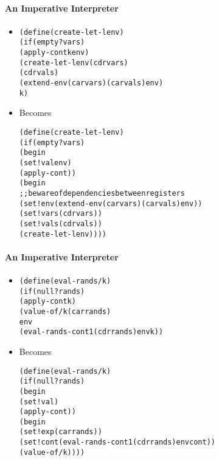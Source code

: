 \documentclass{beamer}
\newcommand{\elist}{\texttt{\textquotesingle{()}}}
\begin{document}
\begin{frame}[fragile]
\framesubtitle{An Imperative Interpreter}
\begin{scriptsize}
\begin{itemize}
\item<1->
\begin{alltt}
(define (create-let-lenv)
  (if (empty? vars)
      (apply-cont k env)
      (create-let-lenv (cdr vars)
                       (cdr vals)
                       (extend-env (car vars) (car vals) env)
                       k)
\end{alltt}

\item<1-> Becomes
\begin{alltt}
(define (create-let-lenv)
  (if (empty? vars)
      (begin
        (set! val env)
        (apply-cont))
      (begin
        ;; beware of dependencies between registers
        (set! env (extend-env (car vars) (car vals) env)) 
        (set! vars (cdr vars))
        (set! vals (cdr vals))
        (create-let-lenv))))
\end{alltt}

\end{itemize}
\end{scriptsize}
\end{frame}

\begin{frame}[fragile]
\framesubtitle{An Imperative Interpreter}
\begin{scriptsize}
\begin{itemize}
\item<1->
\begin{alltt}
(define (eval-rands/k)
  (if (null? rands)
      (apply-cont k \elist{})
      (value-of/k (car rands) 
                  env 
                  (eval-rands-cont1 (cdr rands) env k))
\end{alltt}

\item<1-> Becomes
\begin{alltt}
(define (eval-rands/k)
  (if (null? rands)
      (begin
        (set! val \elist{})
        (apply-cont))
      (begin
        (set! exp (car rands))
        (set! cont (eval-rands-cont1 (cdr rands) env cont))
        (value-of/k))))
\end{alltt}

\end{itemize}
\end{scriptsize}
\end{frame}
\end{document}
